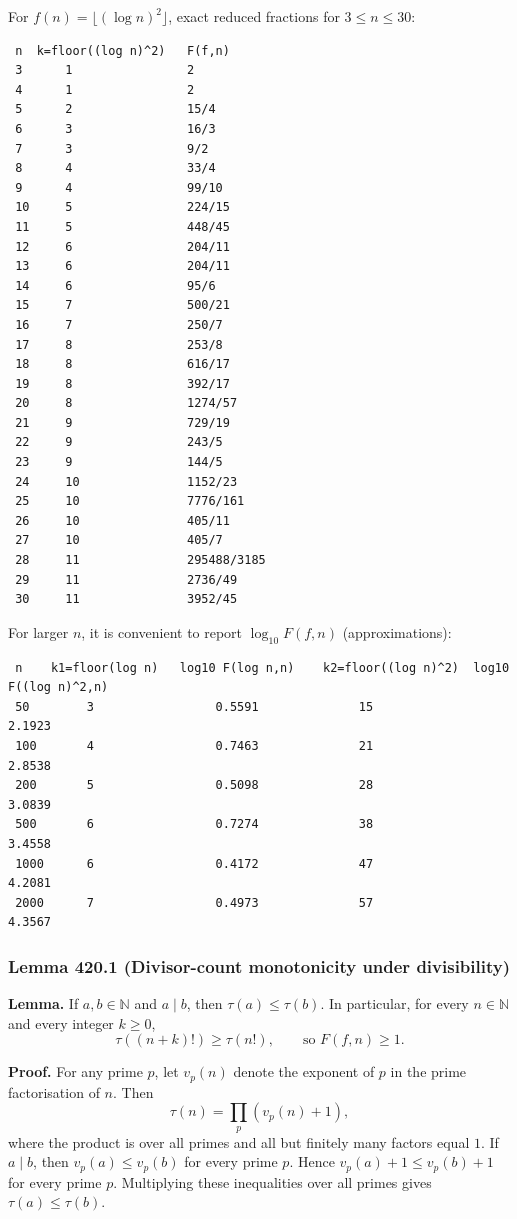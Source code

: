 For $f(n)=\lfloor(\log n)^2\rfloor$, exact reduced fractions for $3\le n\le 30$:
\begin{verbatim}
 n  k=floor((log n)^2)   F(f,n)
 3      1                2
 4      1                2
 5      2                15/4
 6      3                16/3
 7      3                9/2
 8      4                33/4
 9      4                99/10
 10     5                224/15
 11     5                448/45
 12     6                204/11
 13     6                204/11
 14     6                95/6
 15     7                500/21
 16     7                250/7
 17     8                253/8
 18     8                616/17
 19     8                392/17
 20     8                1274/57
 21     9                729/19
 22     9                243/5
 23     9                144/5
 24     10               1152/23
 25     10               7776/161
 26     10               405/11
 27     10               405/7
 28     11               295488/3185
 29     11               2736/49
 30     11               3952/45
\end{verbatim}

For larger $n$, it is convenient to report $\log_{10} F(f,n)$ (approximations):
\begin{verbatim}
 n    k1=floor(log n)   log10 F(log n,n)    k2=floor((log n)^2)  log10 F((log n)^2,n)
 50        3                 0.5591              15                 2.1923
 100       4                 0.7463              21                 2.8538
 200       5                 0.5098              28                 3.0839
 500       6                 0.7274              38                 3.4558
 1000      6                 0.4172              47                 4.2081
 2000      7                 0.4973              57                 4.3567
\end{verbatim}

\subsubsection*{Lemma 420.1 (Divisor-count monotonicity under divisibility)}
\textbf{Lemma.} If $a,b\in\mathbb{N}$ and $a\mid b$, then $\tau(a)\le \tau(b)$.
In particular, for every $n\in\mathbb{N}$ and every integer $k\ge 0$,
\[
\tau((n+k)!)\ge \tau(n!),\qquad\text{so }F(f,n)\ge 1.
\]

\textbf{Proof.}
For any prime $p$, let $v_p(n)$ denote the exponent of $p$ in the prime factorisation of $n$.
Then
\[
\tau(n)=\prod_{p} (v_p(n)+1),
\]
where the product is over all primes and all but finitely many factors equal $1$.
If $a\mid b$, then $v_p(a)\le v_p(b)$ for every prime $p$. Hence $v_p(a)+1\le v_p(b)+1$ for every prime $p$.
Multiplying these inequalities over all primes gives $\tau(a)\le \tau(b)$.

